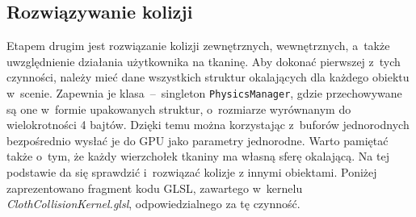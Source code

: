 		\subsection{Rozwiązywanie kolizji}
		\label{t:symulacja:dzialanie:kolizje}
			
		
		Etapem drugim jest rozwiązanie kolizji zewnętrznych, wewnętrznych, a~także uwzględnienie działania użytkownika na tkaninę. Aby dokonać pierwszej z~tych czynności, należy mieć dane wszystkich struktur okalających dla każdego obiektu w~scenie. Zapewnia je klasa~--~singleton \texttt{PhysicsManager}, gdzie przechowywane są one w~formie upakowanych struktur, o~rozmiarze wyrównanym do wielokrotności 4 bajtów. Dzięki temu można korzystając z~buforów jednorodnych bezpośrednio wysłać je do GPU jako parametry jednorodne. Warto pamiętać także o~tym, że każdy wierzchołek tkaniny ma własną sferę okalającą. Na tej podstawie da się sprawdzić i~rozwiązać kolizje z innymi obiektami. Poniżej zaprezentowano fragment kodu GLSL, zawartego w~kernelu \emph{ClothCollisionKernel.glsl}, odpowiedzialnego za tę czynność.
		\newpage
